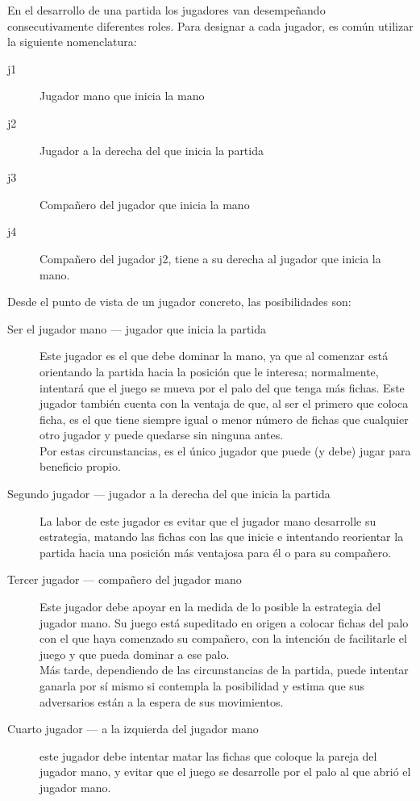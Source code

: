 En el desarrollo de una partida los jugadores van desempeñando consecutivamente diferentes roles. Para designar
a cada jugador, es común utilizar la siguiente nomenclatura: 

\begin{description}
    \item[j1] Jugador mano que inicia la mano
    \item[j2] Jugador a la derecha del que inicia la partida
    \item[j3] Compañero del jugador que inicia la mano
    \item[j4] Compañero del jugador j2, tiene a su derecha al jugador que inicia la mano.
\end{description}

Desde el punto de vista de un jugador concreto, las posibilidades son: \\
\begin{description}
    \item[Ser el jugador mano --- jugador que inicia la partida] Este jugador es el que debe dominar la mano, ya
        que al comenzar está orientando la partida hacia la posición que le interesa; normalmente, intentará
        que el juego se mueva por el palo del que tenga más fichas. Este jugador también cuenta
        con la ventaja de que, al ser el primero que coloca ficha, es el que tiene siempre igual o menor número
        de fichas que cualquier otro jugador y puede quedarse sin ninguna antes. \\
        Por estas circunstancias, es el único jugador que puede (y debe) jugar para beneficio propio.
    \item[Segundo jugador --- jugador a la derecha del que inicia la partida] La labor de este jugador es
        evitar que el jugador mano desarrolle su estrategia, matando las fichas con las que inicie e intentando
        reorientar la partida hacia una posición más ventajosa para él o para su compañero.
    \item[Tercer jugador --- compañero del jugador mano] Este jugador debe apoyar en la medida de lo posible
        la estrategia del jugador mano. Su juego está supeditado en origen a colocar fichas del palo con el
        que haya comenzado su compañero, con la intención de facilitarle el juego y que pueda dominar a ese palo. \\
        Más tarde, dependiendo de las circunstancias de la partida, puede intentar ganarla por sí mismo
        si contempla la posibilidad y estima que sus adversarios están a la espera de sus movimientos.
    \item[Cuarto jugador --- a la izquierda del jugador mano] este jugador debe intentar matar las fichas que coloque
        la pareja del jugador mano, y evitar que el juego se desarrolle por el palo al que abrió el jugador mano.
        
\end{description}


